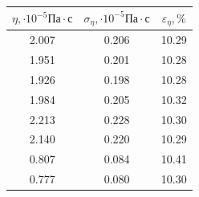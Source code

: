\documentclass[a4paper]{article}
\begin{document}
\begin{enumerate}
\begin{table}[h!]
    \centering
    \begin{tabular}{|c|c|c|}
        \hline
        $\eta, \cdot 10^{-5} \text{Па} \cdot \text{с}$ & $\sigma_\eta, \cdot 10^{-5} \text{Па} \cdot \text{с}$ & $\varepsilon_\eta, \%$ \\
        \hline
        2.007 & 0.206 & 10.29 \\ \hline
        1.951 & 0.201 & 10.28 \\ \hline
        1.926 & 0.198 & 10.28 \\ \hline
        1.984 & 0.205 & 10.32 \\ \hline
        2.213 & 0.228 & 10.30 \\ \hline
        2.140 & 0.220 & 10.29 \\ \hline
        0.807 & 0.084 & 10.41 \\ \hline
        0.777 & 0.080 & 10.30 \\ \hline
    \end{tabular}
\end{table}


\end{enumerate}
\end{document}
